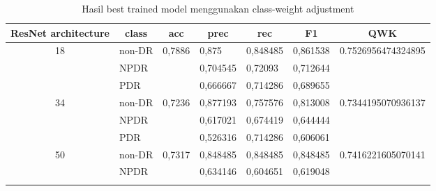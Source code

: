     \begin{table}[h!]
        \begin{center}
        \caption{Hasil best trained model menggunakan class-weight adjustment}
        \label{tb:HasilTrainClassWeight}
            \begin{tabular}{|c|l|c|l|l|l|c|}
            \hline
            ResNet   architecture & \multicolumn{1}{c|}{class} & acc                     & \multicolumn{1}{c|}{prec} & \multicolumn{1}{c|}{rec} & \multicolumn{1}{c|}{F1} & QWK                                 \\ \hline
            \multirow{3}{*}{18}   & non-DR                     & \multirow{3}{*}{0,7886} & 0,875                     & 0,848485                 & 0,861538                & \multirow{3}{*}{0.7526956474324895} \\ \cline{2-2} \cline{4-6}
                                  & NPDR                       &                         & 0,704545                  & 0,72093                  & 0,712644                &                                     \\ \cline{2-2} \cline{4-6}
                                  & PDR                        &                         & 0,666667                  & 0,714286                 & 0,689655                &                                     \\ \hline
            \multirow{3}{*}{34}   & non-DR                     & \multirow{3}{*}{0,7236} & 0,877193                  & 0,757576                 & 0,813008                & \multirow{3}{*}{0.7344195070936137} \\ \cline{2-2} \cline{4-6}
                                  & NPDR                       &                         & 0,617021                  & 0,674419                 & 0,644444                &                                     \\ \cline{2-2} \cline{4-6}
                                  & PDR                        &                         & 0,526316                  & 0,714286                 & 0,606061                &                                     \\ \hline
            \multirow{3}{*}{50}   & non-DR                     & \multirow{3}{*}{0,7317} & 0,848485                  & 0,848485                 & 0,848485                & \multirow{3}{*}{0.7416221605070141} \\ \cline{2-2} \cline{4-6}
                                  & NPDR                       &                         & 0,634146                  & 0,604651                 & 0,619048                &                                     \\ \cline{2-2} \cline{4-6}

\end{tabular}
\end{center}
\end{table}
